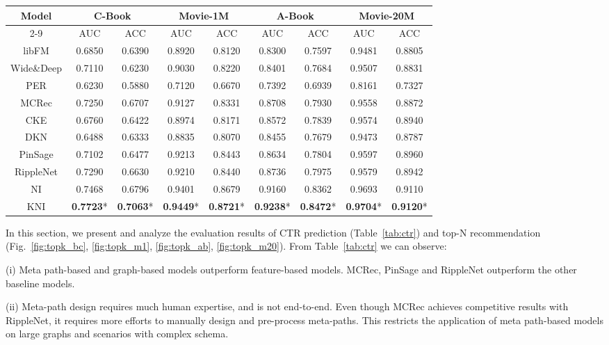 \documentclass[sigconf]{acmart}
\begin{document}
\begin{table*}
\centering
\caption{The results of CTR prediction. \emph{Note}: ``*'' indicates the statistically significant improvements over the best baseline, with -value smaller than  in two-sided -test.}\label{tab:ctr}
\begin{tabular}{c|cc|cc|cc|cc} \hline
\multirow{2}{*}{Model} & \multicolumn{2}{|c|}{C-Book} & \multicolumn{2}{|c|}{Movie-1M} & \multicolumn{2}{|c|}{A-Book} & \multicolumn{2}{|c}{Movie-20M} \\ \cline{2-9}
& AUC & ACC & AUC & ACC & AUC & ACC & AUC & ACC \\ \hline\hline
libFM & 0.6850 & 0.6390 & 0.8920 & 0.8120 &	0.8300 & 0.7597 & 0.9481 & 0.8805\\
Wide\&Deep & 0.7110 & 0.6230 & 0.9030 &	0.8220 & 0.8401 & 0.7684 & 0.9507 &	0.8831 \\ \hline
PER & 0.6230 & 0.5880 & 0.7120 & 0.6670 & 0.7392 & 0.6939 & 0.8161 & 0.7327 \\
MCRec & 0.7250 & 0.6707 & 0.9127 & 0.8331 & 0.8708 & 0.7930 & 0.9558 & 0.8872 \\ \hline
CKE & 0.6760 & 0.6422 & 0.8974 & 0.8171 & 0.8572 & 0.7839 & 0.9574 & 0.8940 \\
DKN & 0.6488 & 0.6333 & 0.8835 & 0.8070 & 0.8455 & 0.7679 & 0.9473 & 0.8787 \\ 
PinSage & 0.7102 & 0.6477 & 0.9213 & 0.8443 & 0.8634 & 0.7804 & 0.9597 & 0.8960 \\
RippleNet & 0.7290 & 0.6630 & 0.9210 & 0.8440 & 0.8736 & 0.7975 & 0.9579 & 0.8942\\ \hline
NI & 0.7468 & 0.6796 & 0.9401 & 0.8679 & 0.9160 & 0.8362 & 0.9693 & 0.9110 \\
KNI & \textbf{0.7723}* & \textbf{0.7063}* & \textbf{0.9449}* & \textbf{0.8721}* & \textbf{0.9238}* & \textbf{0.8472}* & \textbf{0.9704}* & \textbf{0.9120}* \\ \hline
\end{tabular}
\end{table*}

In this section, we present and analyze the evaluation results of CTR prediction (Table~\ref{tab:ctr}) and top-N recommendation (Fig.~\ref{fig:topk_bc}, \ref{fig:topk_m1}, \ref{fig:topk_ab}, \ref{fig:topk_m20}).
From Table~\ref{tab:ctr} we can observe:

(i) Meta path-based and graph-based models outperform feature-based models. MCRec, PinSage and RippleNet outperform the other baseline models. 

(ii) Meta-path design requires much human expertise, and is not end-to-end. 
Even though MCRec achieves competitive results with RippleNet, it requires more efforts to manually design and pre-process meta-paths. This restricts the application of meta path-based models on large graphs and scenarios with complex schema.
\end{document}
